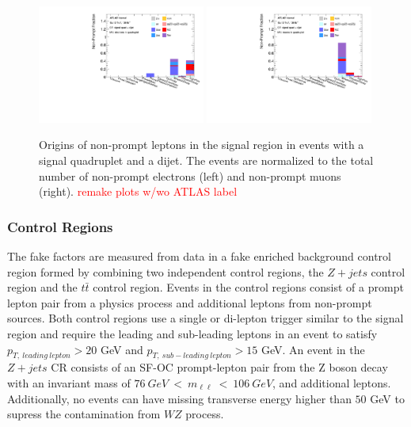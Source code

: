 \begin{figure}[htb]
    \centering
    \includegraphics[width = 0.49\textwidth]{figures/Analysis/Background/NonPromptElectronSRVBSComposition.pdf}
    \includegraphics[width = 0.49\textwidth]{figures/Analysis/Background/NonPromptMuonSRVBSComposition.pdf}
    \caption{ Origins of non-prompt leptons in the signal region in events with a signal quadruplet and a dijet. The events are normalized to the total number of non-prompt electrons (left) and non-prompt muons (right). \textcolor{red}{remake plots w/wo ATLAS label} \label{fig:NonPromptLepSRDijet}}
\end{figure}

\subsubsection{Control Regions}
\label{subsubsec:CR}
The fake factors are measured from data in a fake enriched background control region formed by combining two independent control regions, the $Z+jets$ control region and the $t\bar{t}$ control region. Events in the control regions consist of a prompt lepton pair from a physics process and additional leptons from non-prompt sources. Both control regions use a single or di-lepton trigger similar to the signal region and require the leading and sub-leading leptons in an event to satisfy $p_{T,~leading~lepton} > 20$ GeV and $p_{T,~sub-leading~lepton} > 15$ GeV. An event in the $Z+jets$ CR consists of an SF-OC prompt-lepton pair from the Z boson decay with an invariant mass of $ 76~GeV~<~m_{\ell \ell}~<~106~GeV$, and additional leptons. Additionally, no events can have missing transverse energy higher than $50$ GeV to supress the contamination from $WZ$ process.

